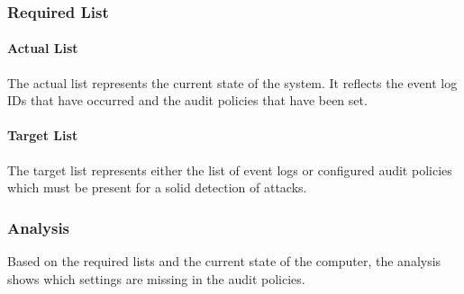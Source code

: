 \subsubsection{Required List}
\paragraph{Actual List}
The actual list represents the current state of the system. It reflects the event log IDs that have occurred and the audit policies that have been set.

\paragraph{Target List}
The target list represents either the list of event logs or configured audit policies which must be present for a solid detection of attacks.

\subsubsection{Analysis}
Based on the required lists and the current state of the computer, the analysis shows which settings are missing in the audit policies.